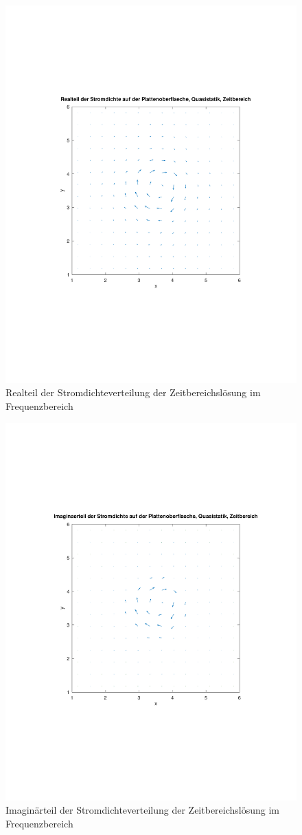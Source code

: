 \documentclass[Protokollheft.tex]{subfiles}
\begin{document}
\begin{figure}[h]
	\centering
	\includegraphics[trim = 15mm 65mm 15mm 65mm, clip,width=0.7\linewidth]{Stromdichte_real_t.pdf}
	\caption{Realteil der Stromdichteverteilung der Zeitbereichslösung im Frequenzbereich}
	\label{fig:Stromdichte_real_t}
\end{figure}
\begin{figure}[h]
	\centering
	\includegraphics[trim = 15mm 65mm 15mm 65mm, clip,width=0.7\linewidth]{Stromdichte_ima_t.pdf}
	\caption{Imaginärteil der Stromdichteverteilung der Zeitbereichslösung im Frequenzbereich}
	\label{fig:Stromdichte_ima_t}
\end{figure}
\end{document}
